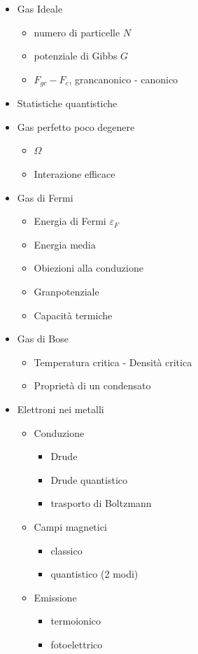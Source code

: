 \begin{itemize}
	\item Gas Ideale
	\begin{itemize}
		\item numero di particelle $ N $
		\item potenziale di Gibbs $ G $
		\item $ F_{gc} - F_c $, grancanonico - canonico
	\end{itemize}
	\item Statistiche quantistiche
	\item Gas perfetto poco degenere
	\begin{itemize}
		\item $ \Omega $
		\item Interazione efficace
	\end{itemize}
	\item Gas di Fermi
	\begin{itemize}
		\item Energia di Fermi $ \varepsilon_F $
		\item Energia media
		\item Obiezioni alla conduzione
		\item Granpotenziale
		\item Capacità termiche
	\end{itemize}
	\item Gas di Bose
	\begin{itemize}
		\item Temperatura critica - Densità critica
		\item Proprietà di un condensato
	\end{itemize}
	\item Elettroni nei metalli
	\begin{itemize}
		\item Conduzione
		\begin{itemize}
			\item Drude
			\item Drude quantistico
			\item trasporto di Boltzmann
		\end{itemize}
		\item Campi magnetici
		\begin{itemize}
			\item classico
			\item quantistico (2 modi)
		\end{itemize}
		\item Emissione
		\begin{itemize}
			\item termoionico
			\item fotoelettrico
		\end{itemize}
	\end{itemize}
\end{itemize}
